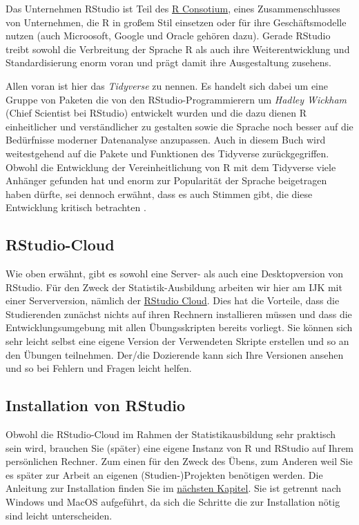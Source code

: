 \documentclass[
]{book}
\begin{document}
Das Unternehmen RStudio ist Teil des \href{https://www.r-consortium.org/}{R Consotium}, eines Zusammenschlusses von Unternehmen, die R in großem Stil einsetzen oder für ihre Geschäftsmodelle nutzen (auch Microosoft, Google und Oracle gehören dazu).
Gerade RStudio treibt sowohl die Verbreitung der Sprache R als auch ihre Weiterentwicklung und Standardisierung enorm voran und prägt damit ihre Ausgestaltung zusehens.

Allen voran ist hier das \emph{Tidyverse} zu nennen. Es handelt sich dabei um eine Gruppe von Paketen die von den RStudio-Programmierern um \emph{Hadley Wickham} (Chief Scientist bei RStudio) entwickelt wurden und die dazu dienen R einheitlicher und verständlicher zu gestalten sowie die Sprache noch besser auf die Bedürfnisse moderner Datenanalyse anzupassen. Auch in diesem Buch wird weitestgehend auf die Pakete und Funktionen des Tidyverse zurückgegriffen.
Obwohl die Entwicklung der Vereinheitlichung von R mit dem Tidyverse viele Anhänger gefunden hat und enorm zur Popularität der Sprache beigetragen haben dürfte, sei dennoch erwähnt, dass es auch Stimmen gibt, die diese Entwicklung kritisch betrachten \citep{Matloff_2019, McChesney_2020}.

\hypertarget{rstudio-cloud}{%
\subsection{RStudio-Cloud}\label{rstudio-cloud}}

Wie oben erwähnt, gibt es sowohl eine Server- als auch eine Desktopversion von RStudio.
Für den Zweck der Statistik-Ausbildung arbeiten wir hier am IJK mit einer Serverversion, nämlich der \href{https://rstudio.cloud/}{RStudio Cloud}.
Dies hat die Vorteile, dass die Studierenden zunächst nichts auf ihren Rechnern installieren müssen und dass die Entwicklungsumgebung mit allen Übungsskripten bereits vorliegt.
Sie können sich sehr leicht selbst eine eigene Version der Verwendeten Skripte erstellen und so an den Übungen teilnehmen.
Der/die Dozierende kann sich Ihre Versionen ansehen und so bei Fehlern und Fragen leicht helfen.

\hypertarget{installation-von-rstudio}{%
\subsection{Installation von RStudio}\label{installation-von-rstudio}}

Obwohl die RStudio-Cloud im Rahmen der Statistikausbildung sehr praktisch sein wird, brauchen Sie (später) eine eigene Instanz von R und RStudio auf Ihrem persönlichen Rechner. Zum einen für den Zweck des Übens, zum Anderen weil Sie es später zur Arbeit an eigenen (Studien-)Projekten benötigen werden.
Die Anleitung zur Installation finden Sie im \protect\hyperlink{intallation}{nächsten Kapitel}.
Sie ist getrennt nach Windows und MacOS aufgeführt, da sich die Schritte die zur Installation nötig sind leicht unterscheiden.
\end{document}

